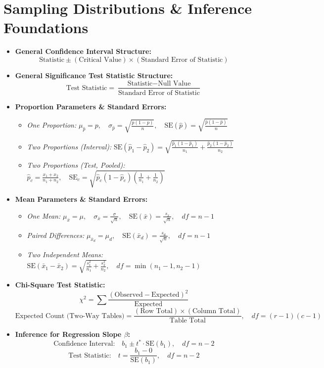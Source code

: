 \section{Sampling Distributions \& Inference Foundations}
\begin{itemize}[leftmargin=1.5em]
  \item \textbf{General Confidence Interval Structure:}
  \[ \text{Statistic} \pm (\text{Critical Value}) \times (\text{Standard Error of Statistic}) \]
  \item \textbf{General Significance Test Statistic Structure:}
  \[ \text{Test Statistic} = \frac{\text{Statistic} - \text{Null Value}}{\text{Standard Error of Statistic}} \]
  \item \textbf{Proportion Parameters \& Standard Errors:}
  \begin{itemize}
    \item \textit{One Proportion:} $\mu_{\hat{p}} = p, \quad \sigma_{\hat{p}} = \sqrt{\frac{p(1-p)}{n}}, \quad \text{SE}(\hat{p}) = \sqrt{\frac{\hat{p}(1-\hat{p})}{n}}$
    \item \textit{Two Proportions (Interval):} $\text{SE}(\hat{p}_1 - \hat{p}_2) = \sqrt{\frac{\hat{p}_1(1-\hat{p}_1)}{n_1} + \frac{\hat{p}_2(1-\hat{p}_2)}{n_2}}$
    \item \textit{Two Proportions (Test, Pooled):} $\hat{p}_c = \frac{x_1 + x_2}{n_1 + n_2}, \quad \text{SE}_c = \sqrt{\hat{p}_c(1-\hat{p}_c)\left(\frac{1}{n_1} + \frac{1}{n_2}\right)}$
  \end{itemize}
  \item \textbf{Mean Parameters \& Standard Errors:}
  \begin{itemize}
    \item \textit{One Mean:} $\mu_{\bar{x}} = \mu, \quad \sigma_{\bar{x}} = \frac{\sigma}{\sqrt{n}}, \quad \text{SE}(\bar{x}) = \frac{s_x}{\sqrt{n}}, \quad df = n - 1$
    \item \textit{Paired Differences:} $\mu_{\bar{x}_d} = \mu_d, \quad \text{SE}(\bar{x}_d) = \frac{s_d}{\sqrt{n}}, \quad df = n - 1$
    \item \textit{Two Independent Means:} $\text{SE}(\bar{x}_1 - \bar{x}_2) = \sqrt{\frac{s_1^2}{n_1} + \frac{s_2^2}{n_2}}, \quad df = \min(n_1-1, n_2-1)$
  \end{itemize}
  \item \textbf{Chi-Square Test Statistic:}
  \[ \chi^2 = \sum \frac{(\text{Observed} - \text{Expected})^2}{\text{Expected}} \]
  \[ \text{Expected Count (Two-Way Tables)} = \frac{(\text{Row Total}) \times (\text{Column Total})}{\text{Table Total}}, \quad df = (r - 1)(c - 1) \]
  \item \textbf{Inference for Regression Slope $\beta$:}
  \[ \text{Confidence Interval:} \quad b_1 \pm t^* \cdot \text{SE}(b_1), \quad df = n - 2 \]
  \[ \text{Test Statistic:} \quad t = \frac{b_1 - 0}{\text{SE}(b_1)}, \quad df = n - 2 \]
\end{itemize}

